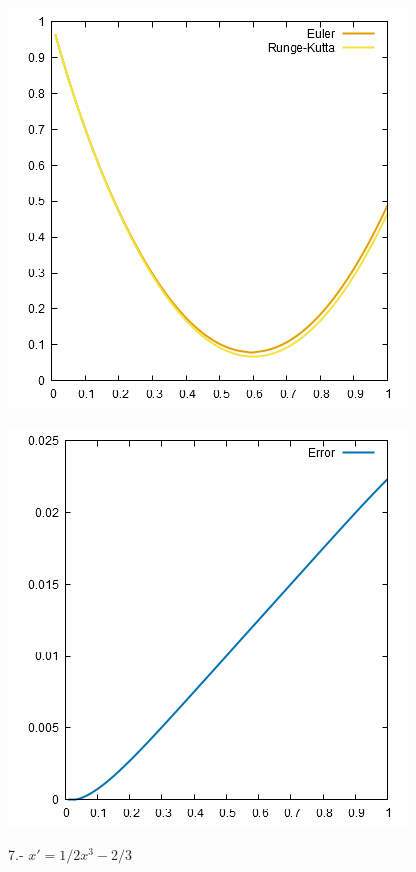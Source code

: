\documentclass[10pt]{article}
\begin{document}
\begin{multicols}{2}
\begin{center}
				\includegraphics[scale=0.4]{../Graficas/6.png}
			\end{center}
			\begin{center}
				\includegraphics[scale=0.4]{../Graficas/6_1.png}
			\end{center}
			7.- $x'=1/2x^3-2/3$
			\begin{center}

\end{center}
\end{multicols}
\end{document}
